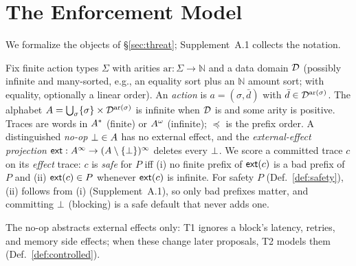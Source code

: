 \section{The Enforcement Model}\label{sec:model}

We formalize the objects of \S\ref{sec:threat}; Supplement~A.1 collects the notation.

\begin{definition}\label{def:actions}
Fix finite action types $\Sigma$ with arities $\mathrm{ar}:\Sigma\to\mathbb{N}$
and a data domain $\mathcal{D}$ (possibly infinite and many-sorted, e.g., an equality sort plus an $\mathbb{N}$
amount sort; with equality, optionally a linear
order). An \emph{action} is $a=(\sigma,\bar d)$ with $\bar
d\in\mathcal{D}^{\mathrm{ar}(\sigma)}$. The alphabet
$A=\bigcup_{\sigma}\{\sigma\}\times\mathcal{D}^{\mathrm{ar}(\sigma)}$ is infinite when
$\mathcal{D}$ is and some arity is positive. Traces are words in $A^{*}$ (finite) or $A^{\omega}$ (infinite); $\preceq$
is the prefix order. A distinguished \emph{no-op} $\bot\in A$ has no external
effect, and the \emph{external-effect projection}
$\mathsf{ext}:A^{\infty}\to(A\setminus\{\bot\})^{\infty}$ deletes every $\bot$.
We score a committed trace $c$ on its \emph{effect} trace: $c$ is \emph{safe} for $P$
iff (i) no finite prefix of $\mathsf{ext}(c)$ is a bad prefix of $P$ and (ii)
$\mathsf{ext}(c)\in P$ whenever $\mathsf{ext}(c)$ is infinite. For safety $P$
(Def.~\ref{def:safety}), (ii) follows from (i) (Supplement~A.1), so only bad prefixes
matter, and committing $\bot$ (blocking) is a safe default that never adds one.
\end{definition}
The no-op abstracts external effects only: T1 ignores a block's latency, retries,
and memory side effects; when these change later proposals, T2 models them
(Def.~\ref{def:controlled}).

